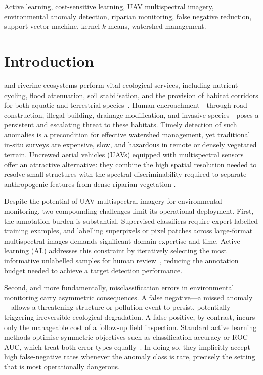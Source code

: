 \documentclass[lettersize,journal]{IEEEtran}
\begin{document}
\begin{IEEEkeywords}
Active learning, cost-sensitive learning, UAV multispectral imagery,
environmental anomaly detection, riparian monitoring, false negative
reduction, support vector machine, kernel $k$-means, watershed
management.
\end{IEEEkeywords}

\IEEEpubidadjcol

\section{Introduction}
 and riverine ecosystems perform vital ecological
services, including nutrient cycling, flood attenuation, soil stabilisation,
and the provision of habitat corridors for both aquatic and terrestrial
species~\cite{arguello2021watershed}. Human encroachment---through road
construction, illegal building, drainage modification, and invasive
species---poses a persistent and escalating threat to these habitats.
Timely detection of such anomalies is a precondition for effective
watershed management, yet traditional in-situ surveys are expensive, slow,
and hazardous in remote or densely vegetated terrain.
Uncrewed aerial vehicles (UAVs) equipped with multispectral sensors offer
an attractive alternative: they combine the high spatial resolution needed
to resolve small structures with the spectral discriminability required to
separate anthropogenic features from dense riparian vegetation
\cite{colomina2014uav,arguello2021watershed}.

Despite the potential of UAV multispectral imagery for environmental
monitoring, two compounding challenges limit its operational deployment.
First, the annotation burden is substantial. Supervised classifiers require
expert-labelled training examples, and labelling superpixels or pixel
patches across large-format multispectral images demands significant domain
expertise and time. Active learning (AL) addresses this constraint by
iteratively selecting the most informative unlabelled samples for human
review~\cite{settles2012active,tuia2011survey}, reducing the annotation
budget needed to achieve a target detection performance.

Second, and more fundamentally, misclassification errors in environmental
monitoring carry asymmetric consequences. A false negative---a missed
anomaly---allows a threatening structure or pollution event to persist,
potentially triggering irreversible ecological degradation. A false
positive, by contrast, incurs only the manageable cost of a follow-up
field inspection. Standard active learning methods optimise symmetric
objectives such as classification accuracy or ROC-AUC, which treat both
error types equally~\cite{crawford2013active}. In doing so, they implicitly
accept high false-negative rates whenever the anomaly class is rare,
precisely the setting that is most operationally dangerous.
\end{document}
